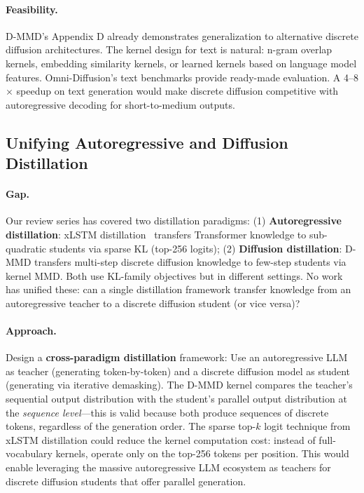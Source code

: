 \documentclass[11pt]{article}
\begin{document}
\paragraph{Feasibility.}
D-MMD's Appendix D already demonstrates generalization to alternative discrete diffusion architectures.
The kernel design for text is natural: n-gram overlap kernels, embedding similarity kernels, or learned kernels based on language model features.
Omni-Diffusion's text benchmarks provide ready-made evaluation.
A 4--8$\times$ speedup on text generation would make discrete diffusion competitive with autoregressive decoding for short-to-medium outputs.

\subsection{Unifying Autoregressive and Diffusion Distillation}

\paragraph{Gap.}
Our review series has covered two distillation paradigms:
(1) \textbf{Autoregressive distillation}: xLSTM distillation~\cite{xlstm-distill} transfers Transformer knowledge to sub-quadratic students via sparse KL (top-256 logits);
(2) \textbf{Diffusion distillation}: D-MMD transfers multi-step discrete diffusion knowledge to few-step students via kernel MMD.
Both use KL-family objectives but in different settings.
No work has unified these: can a single distillation framework transfer knowledge from an autoregressive teacher to a discrete diffusion student (or vice versa)?

\paragraph{Approach.}
Design a \textbf{cross-paradigm distillation} framework:
Use an autoregressive LLM as teacher (generating token-by-token) and a discrete diffusion model as student (generating via iterative demasking).
The D-MMD kernel compares the teacher's sequential output distribution with the student's parallel output distribution at the \emph{sequence level}---this is valid because both produce sequences of discrete tokens, regardless of the generation order.
The sparse top-$k$ logit technique from xLSTM distillation could reduce the kernel computation cost: instead of full-vocabulary kernels, operate only on the top-256 tokens per position.
This would enable leveraging the massive autoregressive LLM ecosystem as teachers for discrete diffusion students that offer parallel generation.
\end{document}

